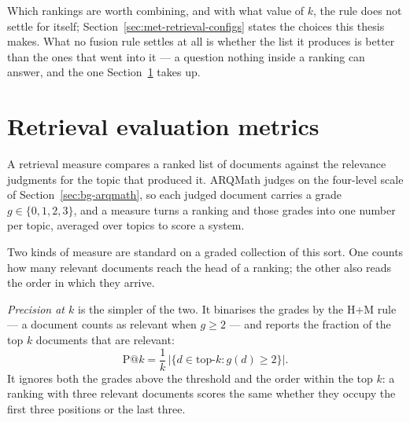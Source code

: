Which rankings are worth combining, and with what value of $k$, the rule does not
settle for itself; Section~\ref{sec:met-retrieval-configs} states the choices this
thesis makes. What no fusion rule settles at all is whether the list it produces
is better than the ones that went into it --- a question nothing inside a ranking
can answer, and the one Section~\ref{sec:bg-retrieval-metrics} takes up.

\section{Retrieval evaluation metrics}\label{sec:bg-retrieval-metrics}

A retrieval measure compares a ranked list of documents against the relevance
judgments for the topic that produced it. ARQMath judges on the four-level scale of
Section~\ref{sec:bg-arqmath}, so each judged document carries a grade
$g \in \{0,1,2,3\}$, and a measure turns a ranking and those grades into one number
per topic, averaged over topics to score a system.

Two kinds of measure are standard on a graded collection of this sort. One counts
how many relevant documents reach the head of a ranking; the other also reads the
order in which they arrive.

\emph{Precision at $k$} is the simpler of the two. It binarises the grades by the
H+M rule --- a document counts as relevant when $g \geq 2$ --- and reports the
fraction of the top $k$ documents that are relevant:
\begin{equation}
\mathrm{P}@k = \frac{1}{k}\,\bigl|\{d \in \text{top-}k : g(d) \geq 2\}\bigr| .
\end{equation}
It ignores both the grades above the threshold and the order within the top $k$: a
ranking with three relevant documents scores the same whether they occupy the
first three positions or the last three.

